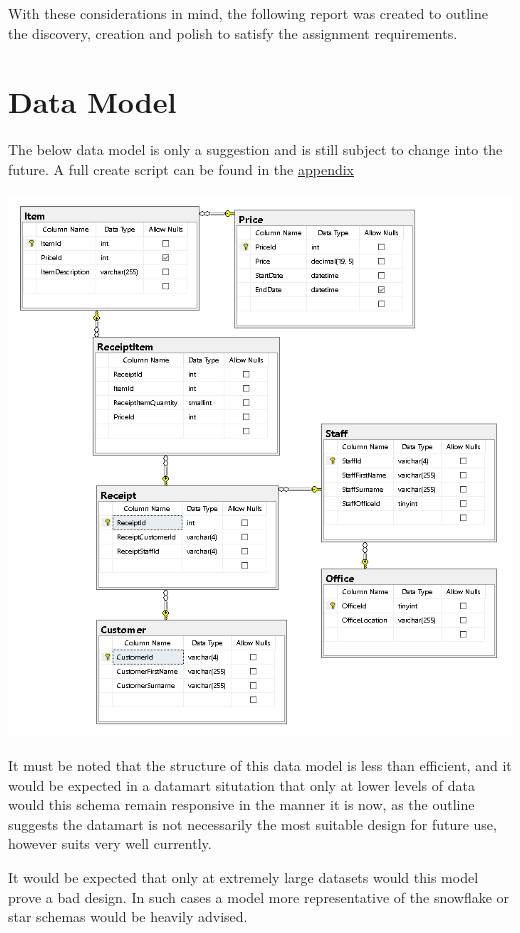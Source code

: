 \documentclass{article}
\begin{document}
    With these considerations in mind, the following report was created to outline
    the discovery, creation and polish to satisfy the assignment requirements.

    \newpage
    \section{Data Model}
    The below data model is only a suggestion and is still subject to change into the future. A full create script can be found in the \hyperref[sec:Appendix]{\color{blue}appendix}
        \begin{center}
            \includegraphics[width=\textwidth]{Images/Suggested_Schema.PNG}
        \end{center}
    It must be noted that the structure of this data model is 
    less than efficient, and it would be expected in a datamart
    situtation that only at lower levels of data would this schema
    remain responsive in the manner it is now, as the outline
    suggests the datamart is not necessarily the most suitable
    design for future use, however suits very well currently.
    \par
    It would be expected that only at extremely large datasets
    would this model prove a bad design. In such cases a model 
    more representative of the snowflake or star schemas would be
    heavily advised.
\end{document}
